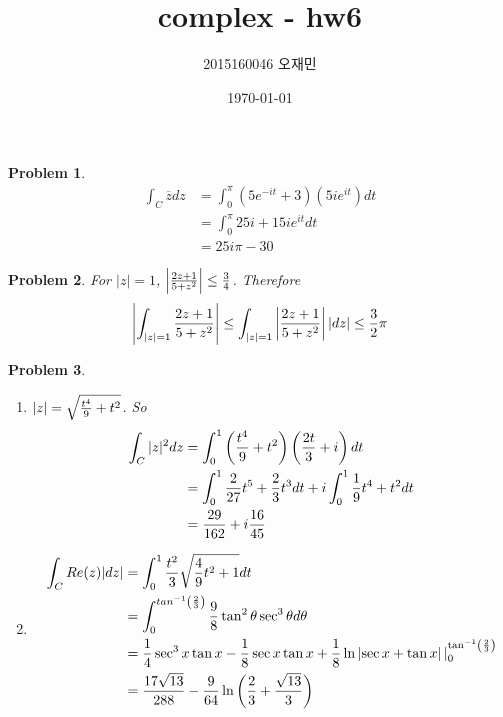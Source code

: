 \documentclass{oblivoir}
\title{complex - hw6}
\author{2015160046 오재민}
\date{\today}
\newtheorem{problem}{Problem}
\begin{document}
\maketitle

\begin{problem}
	\begin{equation}
		\begin{split}
			\int_C \overline{z} dz & =\int_0 ^\pi \left( 5e^{-it}+3 \right)\left( 5ie^{it} \right)dt \\
			& = \int_0 ^\pi 25i + 15ie^{it}dt \\
			& =  25i\pi -30
		\end{split}
		\label{<+label+>}
	\end{equation}
\end{problem}

\begin{problem}
	For $\left| z  \right | = 1$, $\left | \frac{2z + 1 }{5+z^2} \right | \leq {3 \over 4}$.
	Therefore
	\begin{equation}
		\left | \int_{\left | z  \right | = 1} \frac{2z+1}{5+z^2} \right | \leq \int_{\left | z  \right | = 1} \left | \frac{2z + 1}{5+z^2} \right | |dz| \leq {3 \over 2 }\pi
		\label{<+label+>}
	\end{equation}
\end{problem}

\begin{problem}
	\begin{enumerate}[label = (\alph*)]
		\item $|z| = \sqrt{ {t^4 \over 9 } + t^2 }$. So
			\begin{equation}
				\begin{split}
					\int_C |z|^2 dz & = \int_0 ^1 \left( {t^4 \over 9} + t^2 \right)\left( {2t \over 3} + i \right)dt \\
					& = \int_0 ^1 {2 \over 27} t^5 + {2 \over 3} t^3 dt + i \int_0 ^1 {1 \over 9}t^4 + t^2 dt \\
					& = {29 \over 162} + i{16\over 45}
				\end{split}
				\label{<+label+>}
			\end{equation}

		\item \begin{equation}
				\begin{split}
					\int_C Re(z) |dz| & = \int_0 ^1 {t^2 \over 3} \sqrt{ {4\over 9}t^2 + 1}dt \\
					& = \int_0^{tan^{-1}\left( {2\over 3} \right)}{9 \over 8} \tan^2 \theta \sec^3 \theta d\theta \\
					& = {1\over 4} \sec^3x \tan x - {1\over 8}\sec x \tan x + {1 \over 8} \ln \left | \sec x + \tan x  \right | |_0 ^{\tan^{-1}\left( {2\over 3} \right)} \\
					& = \frac{17 \sqrt{13}}{288} -{9 \over 64} \ln\left( {2\over 3} + {\sqrt{13} \over 3} \right)
				\end{split}
				\label{<+label+>}
			\end{equation}
	\end{enumerate}
\end{problem}
\end{document}

